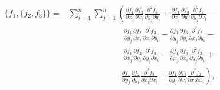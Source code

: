 \begin{align}\begin{split}
    \{f_1, \{f_2, f_3\}\}
    = &\sum_{i=1}^{n} \sum_{j=1}^{n} \left(
        \frac{\partial f_1}{\partial x_j}
        \frac{\partial f_2}{\partial x_i}
        \frac{\partial^2 f_3}{\partial y_j \partial y_i} +
        \frac{\partial f_1}{\partial x_j}
        \frac{\partial f_3}{\partial y_i}
        \frac{\partial^2 f_2}{\partial y_j \partial x_i} - \right.\\
        &\phantom{\sum_{i=1}^{n} \sum_{j=1}^{n}}\ \ \ 
        \frac{\partial f_1}{\partial y_j}
        \frac{\partial f_2}{\partial x_i}
        \frac{\partial^2 f_3}{\partial x_j \partial y_i} - 
        \frac{\partial f_1}{\partial y_j}
        \frac{\partial f_3}{\partial y_i}
        \frac{\partial^2 f_2}{\partial x_j \partial y_i} - \\
        &\phantom{\sum_{i=1}^{n} \sum_{j=1}^{n}}\ \ \ 
        \frac{\partial f_1}{\partial x_j}
        \frac{\partial f_2}{\partial y_i}
        \frac{\partial^2 f_3}{\partial y_j \partial x_i} -
        \frac{\partial f_1}{\partial x_j}
        \frac{\partial f_3}{\partial x_i}
        \frac{\partial^2 f_2}{\partial y_j \partial y_i} + \\
        &\phantom{\sum_{i=1}^{n} \sum_{j=1}^{n}}\ \ \left.
        \frac{\partial f_1}{\partial y_j}
        \frac{\partial f_2}{\partial y_i}
        \frac{\partial^2 f_3}{\partial x_j \partial x_i} +
        \frac{\partial f_1}{\partial y_j}
        \frac{\partial f_3}{\partial x_i}
        \frac{\partial^2 f_2}{\partial x_j \partial x_i}
    \right),
\end{split}\end{align}

